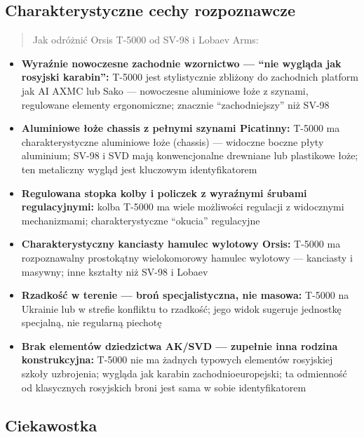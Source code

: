 \documentclass[12pt,oneside]{book}
\providecommand{\tightlist}{%
  \setlength{\itemsep}{0pt}\setlength{\parskip}{0pt}}
\begin{document}
\subsection{Charakterystyczne cechy
rozpoznawcze}\label{charakterystyczne-cechy-rozpoznawcze-79}

\begin{quote}
Jak odróżnić Orsis T-5000 od SV-98 i Lobaev Arms:
\end{quote}

\begin{itemize}
\tightlist
\item
  \textbf{Wyraźnie nowoczesne zachodnie wzornictwo --- ``nie wygląda jak
  rosyjski karabin'':} T-5000 jest stylistycznie zbliżony do zachodnich
  platform jak AI AXMC lub Sako --- nowoczesne aluminiowe łoże z
  szynami, regulowane elementy ergonomiczne; znacznie ``zachodniejszy''
  niż SV-98
\item
  \textbf{Aluminiowe łoże chassis z pełnymi szynami Picatinny:} T-5000
  ma charakterystyczne aluminiowe łoże (chassis) --- widoczne boczne
  płyty aluminium; SV-98 i SVD mają konwencjonalne drewniane lub
  plastikowe łoże; ten metaliczny wygląd jest kluczowym identyfikatorem
\item
  \textbf{Regulowana stopka kolby i policzek z wyraźnymi śrubami
  regulacyjnymi:} kolba T-5000 ma wiele możliwości regulacji z
  widocznymi mechanizmami; charakterystyczne ``okucia'' regulacyjne
\item
  \textbf{Charakterystyczny kanciasty hamulec wylotowy Orsis:} T-5000 ma
  rozpoznawalny prostokątny wielokomorowy hamulec wylotowy --- kanciasty
  i masywny; inne kształty niż SV-98 i Lobaev
\item
  \textbf{Rzadkość w terenie --- broń specjalistyczna, nie masowa:}
  T-5000 na Ukrainie lub w strefie konfliktu to rzadkość; jego widok
  sugeruje jednostkę specjalną, nie regularną piechotę
\item
  \textbf{Brak elementów dziedzictwa AK/SVD --- zupełnie inna rodzina
  konstrukcyjna:} T-5000 nie ma żadnych typowych elementów rosyjskiej
  szkoły uzbrojenia; wygląda jak karabin zachodnioeuropejski; ta
  odmienność od klasycznych rosyjskich broni jest sama w sobie
  identyfikatorem
\end{itemize}

\subsection{Ciekawostka}\label{ciekawostka-79}
\end{document}
